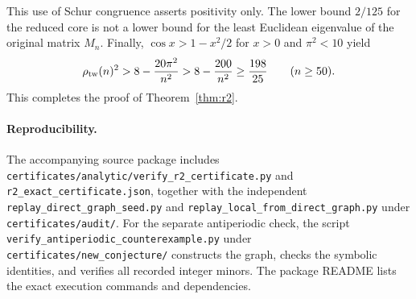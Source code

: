 This use of Schur congruence asserts positivity only. The lower bound
$2/125$ for the reduced core is not a lower bound for the least Euclidean
eigenvalue of the original matrix $M_n$.
Finally, $\cos x>1-x^2/2$ for $x>0$ and $\pi^2<10$ yield
\[
 \rho_{\mathrm{tw}}(n)^2>8-\frac{20\pi^2}{n^2}
          >8-\frac{200}{n^2}\ge\frac{198}{25}
 \qquad(n\ge50).
\]
This completes the proof of Theorem~\ref{thm:r2}.

\paragraph{Reproducibility.}
\begingroup\raggedright
The accompanying source package includes
\nolinkurl{certificates/analytic/verify_r2_certificate.py} and
\nolinkurl{r2_exact_certificate.json}, together with the independent
\nolinkurl{replay_direct_graph_seed.py} and
\nolinkurl{replay_local_from_direct_graph.py} under
\nolinkurl{certificates/audit/}. For the separate antiperiodic check, the script
\nolinkurl{verify_antiperiodic_counterexample.py} under
\nolinkurl{certificates/new_conjecture/} constructs the graph,
checks the symbolic identities, and verifies all recorded integer minors.
The package README lists the exact execution commands and dependencies.
\par\endgroup
